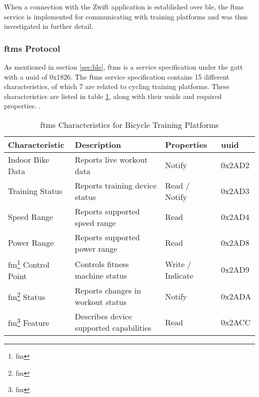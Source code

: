 \vspace{-0.7 cm}

When a connection with the Zwift application is established over \ac{ble}, the \ac{ftms} service is implemented for communicating with training platforms and was thus investigated in further detail.

\subsubsection{\ac{ftms} Protocol}\label{sec:ftms}

As mentioned in section \ref{sec:ble}, \acf{ftms} is a service specification under the \acf{gatt} with a \ac{uuid} of 0x1826. The \ac{ftms} service specification contains 15 different characteristics, of which 7 are related to cycling training platforms. These characteristics are listed in table \ref{tab:ftmsft}, along with their \acp{uuid} and required properties. \cite[section ~4.9]{BLSIG:2017}.


\begin{table}[H]
	\renewcommand{\arraystretch}{\tablestretch}
	\centering
	\caption{\ac{ftms} Characteristics for Bicycle Training Platforms}
	\citep{Huawei:2022}
	\begin{tabularx}{\textwidth}{>{\raggedright}p{3cm} >{\raggedright}X >{\raggedright}p{2.3cm} p{1.3cm}}
		\toprule
		Characteristic                               & Description                             & Properties       & \acs{uuid} \\
		\midrule
		Indoor Bike Data                             & Reports live workout data               & Notify           & 0x2AD2     \\
		Training Status                              & Reports training device status          & Read / Notify    & 0x2AD3     \\
		Speed Range                                  & Reports supported speed range           & Read             & 0x2AD4     \\
		Power Range                                  & Reports supported power range           & Read             & 0x2AD8     \\
		\acs{fm}\footnote[1]{\acf{fm}} Control Point & Controls fitness machine status         & Write / Indicate & 0x2AD9     \\
		\acs{fm}\footnote[1]{\acf{fm}} Status        & Reports changes in workout status       & Notify           & 0x2ADA     \\
		\acs{fm}\footnote[1]{\acf{fm}} Feature       & Describes device supported capabilities & Read             & 0x2ACC     \\
		\bottomrule
	\end{tabularx}
	\label{tab:ftmsft}
\end{table}

